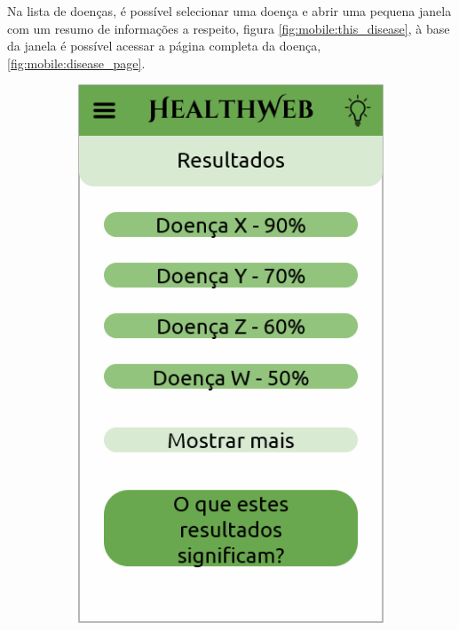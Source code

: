 Na lista de doenças, é possível selecionar uma doença e abrir uma pequena janela com um resumo de informações a respeito, figura \ref{fig:mobile:this_disease}, à base da janela é possível acessar a página completa da doença, \ref{fig:mobile:disease_page}.

\begin{figure}[htbp]
	\centering
	\begin{subfigure}{0.24\linewidth}
		\centering
		\includegraphics[width=\linewidth]{figure/prototype/mobile/results.png}

\end{subfigure}
\end{figure}
